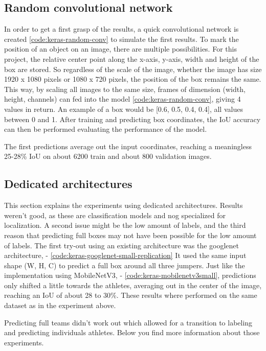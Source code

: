 \subsection{Random convolutional network}


In order to get a first grasp of the results, a quick convolutional network is created \ref{code:keras-random-conv} to simulate the first results. To mark the position of an object on an image, there are multiple possibilities.
For this project, the relative center point along the x-axis, y-axis, width and height of the box are stored. So regardless of the scale of the image, whether the image has size 1920 x 1080 pixels or 1080 x 720 pixels, the position of the box remains the same.
This way, by scaling all images to the same size, frames of dimension (width, height, channels) can fed into the model \ref{code:keras-random-conv}, giving 4 values in return. An example of a box would be [0.6, 0.5, 0.4, 0.4], all values between 0 and 1.
After training and predicting box coordinates, the IoU accuracy can then be performed evaluating the performance of the model.

The first predictions average out the input coordinates, reaching a meaningless 25-28\% IoU on about 6200 train and about 800 validation images.

\subsection{Dedicated architectures}

This section explains the experiments using dedicated architectures. Results weren't good, as these are classification models and nog specialized for localization. A second issue might be the low amount of labels, and the third reason that predicting full boxes may not have been possible for the low amount of labels.
The first try-out using an existing architecture was the googlenet architecture, \autocite{Szegedy2014} - \ref{code:keras-googlenet-small-replication}
It used the same input shape (W, H, C) to predict a full box around all three jumpers. Just like the implementation using MobileNetV3, \autocite{Howard2019} - \ref{code:keras-mobilenetv3small}, predictions only shifted a little towards the athletes, averaging out in the center of the image, reaching an IoU of about 28 to 30\%. These results where performed on the same dataset as in the experiment above.

Predicting full teams didn't work out which allowed for a transition to labeling and predicting individuals athletes. Below you find more information about those experiments.

